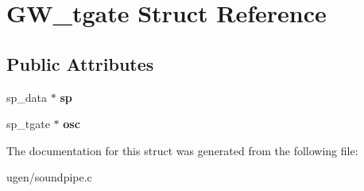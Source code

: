 \hypertarget{structGW__tgate}{}\section{G\+W\+\_\+tgate Struct Reference}
\label{structGW__tgate}
\subsection*{Public Attributes}
\begin{DoxyCompactItemize}
\item 
\hypertarget{structGW__tgate_a2ff67ccbd5a64d11072fb42d0db52529}{}\label{structGW__tgate_a2ff67ccbd5a64d11072fb42d0db52529} 
sp\+\_\+data $\ast$ {\bfseries sp}
\item 
\hypertarget{structGW__tgate_ad16f2227bb5c0e127c5edb50dc965769}{}\label{structGW__tgate_ad16f2227bb5c0e127c5edb50dc965769} 
sp\+\_\+tgate $\ast$ {\bfseries osc}
\end{DoxyCompactItemize}


The documentation for this struct was generated from the following file\+:\begin{DoxyCompactItemize}
\item 
ugen/soundpipe.\+c\end{DoxyCompactItemize}
